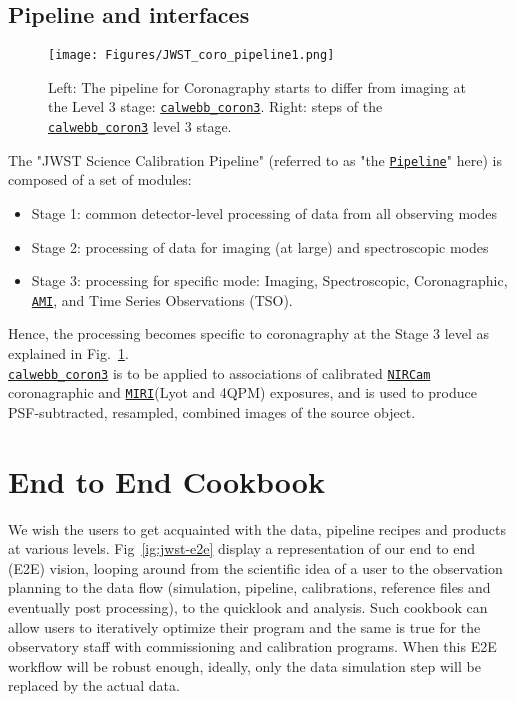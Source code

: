\documentclass[]{spie}  %
\newcommand{\nircam}{{\tt \href{https://jwst.stsci.edu/instrumentation/nircam}{NIRCam}}\xspace}
\newcommand{\miri}{{\tt \href{https://jwst.stsci.edu/instrumentation/miri}{MIRI}}\xspace}
\newcommand{\ami}{{\tt \href{https://jwst-docs.stsci.edu/display/JTI/NIRISS+Aperture+Masking+Interferometry}{AMI}}\xspace}%
\newcommand{\calcoron}{{\tt \href{http://jwst-pipeline.readthedocs.io/en/latest/jwst/pipeline/description.html\#stage-3-coronagraphic-pipeline-step-flow-calwebb-coron3}{calwebb\_coron3}}\xspace}
\newcommand{\pipeline}{{\tt \href{https://jwst-pipeline.readthedocs.io/en/latest/index.html}{Pipeline}}\xspace}
\def\begini{\begin{itemize}[itemsep=0.5pt,topsep=0.5pt]}
\def\endi{\end{itemize}}
\begin{document}
\subsection{Pipeline and interfaces}
\label{sec:pipe}

\begin{figure}[h!]
\begin{center}
\texttt{[image: Figures/JWST\_coro\_pipeline1.png]}
\caption{Left: The pipeline for Coronagraphy starts to differ from imaging at the Level 3 stage: \calcoron. Right: steps of the \calcoron level 3 stage.}
\label{fig:jwst-pipeline}
\end{center}
\end{figure}

The "JWST Science Calibration Pipeline" (referred to as "the \pipeline" here) is composed of a set of modules:
\begini
 \item Stage 1: common detector-level processing of data from all observing modes
 \item Stage 2: processing of data for imaging (at large) and spectroscopic modes  
 \item Stage 3: processing for specific mode: Imaging, Spectroscopic, Coronagraphic, \ami, and Time Series Observations (TSO).
\endi

Hence, the processing becomes specific to coronagraphy at the Stage 3 level as explained in Fig.~\ref{fig:jwst-pipeline}.\\
\calcoron is to be applied to associations of calibrated \nircam coronagraphic and \miri (Lyot and 4QPM) exposures, and is used to produce PSF-subtracted, resampled, combined images of the source object.

\section{End to End Cookbook}
\label{sec:e2e}

We wish the users to get acquainted with the data, pipeline recipes and products at various levels. Fig~\ref{ig:jwst-e2e} display a representation of our end to end (E2E) vision, looping around from the scientific idea of a user to the observation planning to the data flow  (simulation, pipeline, calibrations, reference files and eventually post processing), to the quicklook and analysis. Such cookbook can allow users to iteratively optimize their program and the same is true for the observatory staff with commissioning and calibration programs. When this E2E workflow will be robust enough, ideally, only the data simulation step will be replaced by the actual data.
\end{document}
